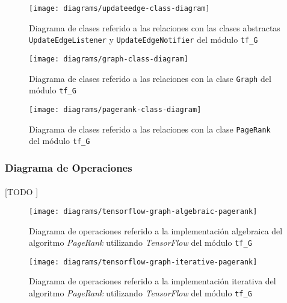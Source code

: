 \documentclass{subfiles}
\begin{document}
          \begin{figure}[h]
            \centering
            \texttt{[image: diagrams/updateedge-class-diagram]}
            \caption{Diagrama de clases referido a las relaciones con las clases abstractas \texttt{UpdateEdgeListener} y \texttt{UpdateEdgeNotifier} del módulo \texttt{tf\_G}}
            \label{img:update_edge_diagram}
          \end{figure}

          \begin{figure}[h]
            \centering
            \texttt{[image: diagrams/graph-class-diagram]}
            \caption{Diagrama de clases referido a las relaciones con la clase \texttt{Graph} del módulo \texttt{tf\_G}}
            \label{img:graph_class_diagram}
          \end{figure}

          \begin{figure}[h]
            \centering
            \texttt{[image: diagrams/pagerank-class-diagram]}
            \caption{Diagrama de clases referido a las relaciones con la clase \texttt{PageRank} del módulo \texttt{tf\_G}}
            \label{img:pagerank_diagram}
          \end{figure}

        \subsubsection{Diagrama de Operaciones}
        \label{sec:operations_diagram}

          \paragraph{}
          [TODO ]

          \begin{figure}[h]
            \centering
            \texttt{[image: diagrams/tensorflow-graph-algebraic-pagerank]}
            \caption{Diagrama de operaciones referido a la implementación algebraica del algoritmo \emph{PageRank} utilizando \emph{TensorFlow} del módulo \texttt{tf\_G}}
            \label{img:pagerank_algebraic_diagram}
          \end{figure}

          \begin{figure}[h]
            \centering
            \texttt{[image: diagrams/tensorflow-graph-iterative-pagerank]}
            \caption{Diagrama de operaciones referido a la implementación iterativa del algoritmo \emph{PageRank} utilizando \emph{TensorFlow} del módulo \texttt{tf\_G}}
            \label{img:pagerank_iterative_diagram}
          \end{figure}
\end{document}
